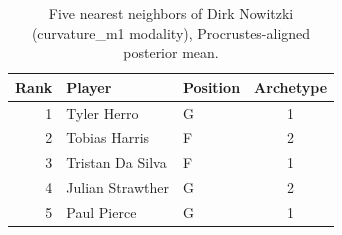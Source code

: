 \begin{table}[htbp]
  \centering\small
  \begin{tabular}{rllc}
    \toprule
    Rank & Player & Position & Archetype \\
    \midrule
    1 & Tyler Herro & G & 1 \\
    2 & Tobias Harris & F & 2 \\
    3 & Tristan Da Silva & F & 1 \\
    4 & Julian Strawther & G & 2 \\
    5 & Paul Pierce & G & 1 \\
    \bottomrule
  \end{tabular}
  \caption{Five nearest neighbors of Dirk Nowitzki (curvature_m1 modality), Procrustes-aligned posterior mean.}
  \label{tab:Dirk_Nowitzki_neighbors_curvature_m1}
\end{table}

